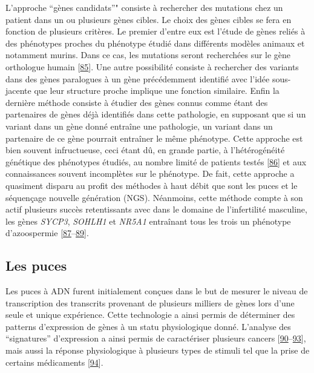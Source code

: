\documentclass[12pt,twoside]{reedthesis}
\theoremstyle{definition}
\theoremstyle{definition}
\theoremstyle{remark}
\begin{document}
  L'approche ``gènes candidats''" consiste à rechercher des mutations chez
  un patient dans un ou plusieurs gènes cibles. Le choix des gènes cibles
  se fera en fonction de plusieurs critères. Le premier d'entre eux est
  l'étude de gènes reliés à des phénotypes proches du phénotype étudié
  dans différents modèles animaux et notamment murins. Dans ce cas, les
  mutations seront recherchées sur le gène orthologue humain
  {[}\protect\hyperlink{ref-DeBoer2015}{85}{]}. Une autre possibilité
  consiste à rechercher des variants dans des gènes paralogues à un gène
  précédemment identifié avec l'idée sous-jacente que leur structure
  proche implique une fonction similaire. Enfin la dernière méthode
  consiste à étudier des gènes connus comme étant des partenaires de gènes
  déjà identifiés dans cette pathologie, en supposant que si un variant
  dans un gène donné entraîne une pathologie, un variant dans un
  partenaire de ce gène pourrait entraîner le même phénotype. Cette
  approche est bien souvent infructueuse, ceci étant dû, en grande partie,
  à l'hétérogénéité génétique des phénotypes étudiés, au nombre limité de
  patients testés {[}\protect\hyperlink{ref-ElInati2012}{86}{]} et aux
  connaissances souvent incomplètes sur le phénotype. De fait, cette
  approche a quasiment disparu au profit des méthodes à haut débit que
  sont les puces et le séquençage nouvelle génération (NGS). Néanmoins,
  cette méthode compte à son actif plusieurs succès retentissants avec
  dans le domaine de l'infertilité masculine, les gènes \emph{SYCP3},
  \emph{SOHLH1} et \emph{NR5A1} entraînant tous les trois un phénotype
  d'azoospermie
  {[}\protect\hyperlink{ref-Miyamoto2003}{87}--\protect\hyperlink{ref-Bashamboo2010}{89}{]}.
  
  \newpage
  
  \subsection{Les puces}\label{les-puces}
  
  Les puces à ADN furent initialement conçues dans le but de mesurer le
  niveau de transcription des transcrits provenant de plusieurs milliers
  de gènes lors d'une seule et unique expérience. Cette technologie a
  ainsi permis de déterminer des patterns d'expression de gènes à un statu
  physiologique donné. L'analyse des ``signatures'' d'expression a ainsi
  permis de caractériser plusieurs cancers
  {[}\protect\hyperlink{ref-Alon1999}{90}--\protect\hyperlink{ref-VantVeer2002}{93}{]},
  mais aussi la réponse physiologique à plusieurs types de stimuli tel que
  la prise de certains médicaments
  {[}\protect\hyperlink{ref-Brachat2002}{94}{]}.
  
\end{document}
